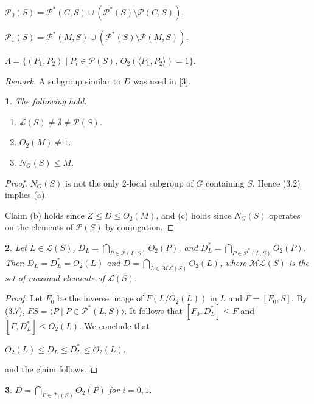 \documentclass[11pt]{article}
\theoremstyle{plain}
\theoremstyle{stmplain}
\newtheorem{stm}{}[section]
\newcommand{\disp}[1]{\begin{center}$\displaystyle #1$\end{center}}
\begin{document}
\medskip
\disp{\mathcal{P}_0(S) = \mathcal{P}^*(C, S) \cup (\mathcal{P}^*(S) \setminus \mathcal{P}(C, S)),}
\disp{\mathcal{P}_1(S) = \mathcal{P}^*(M, S) \cup (\mathcal{P}^*(S) \setminus \mathcal{P}(M, S)),}
\disp{\Lambda = \{(P_1, P_2) \mid P_i \in \mathcal{P}(S),\, O_2(\langle P_1, P_2 \rangle) = 1\}.}

\smallskip
\noindent\textit{Remark.} A subgroup similar to $D$ was used in [3].

\begin{stm}\label{st:4.1}
The following hold:
\begin{enumerate}
\item[(a)] $\mathcal{L}(S) \ne \emptyset \ne \mathcal{P}(S)$.
\item[(b)] $O_2(M) \ne 1$.
\item[(c)] $N_G(S) \le M$.
\end{enumerate}
\end{stm}

\begin{proof}
$N_G(S)$ is not the only 2-local subgroup of $G$ containing $S$. Hence (3.2)
implies (a).

\smallskip
\noindent Claim (b) holds since $Z \le D \le O_2(M)$, and (c) holds since $N_G(S)$
operates on the elements of $\mathcal{P}(S)$ by conjugation.
\end{proof}

\begin{stm}\label{st:4.2}
Let $L \in \mathcal{L}(S)$, $D_L = \bigcap_{P \in \mathcal{P}(L,S)} O_2(P)$,
and $D_L^* = \bigcap_{P \in \mathcal{P}^*(L,S)} O_2(P)$. Then $D_L = D_L^* =
O_2(L)$ and $D = \bigcap_{L \in \mathcal{M}\mathcal{L}(S)} O_2(L)$, where
$\mathcal{M}\mathcal{L}(S)$ is the set of maximal elements of
$\mathcal{L}(S)$.
\end{stm}

\begin{proof}
Let $F_0$ be the inverse image of $F(L/O_2(L))$ in $L$ and $F = [F_0, S]$. By
(3.7), $FS = \langle P \mid P \in \mathcal{P}^*(L, S) \rangle$. It follows that
$[F_0, D_L^*] \le F$ and $[F, D_L^*] \le O_2(L)$. We conclude that
\disp{O_2(L) \le D_L \le D_L^* \le O_2(L).}
and the claim follows.
\end{proof}

\begin{stm}\label{st:4.3}
$D = \bigcap_{P \in \mathcal{P}_i(S)} O_2(P)$ for $i = 0, 1$.
\end{stm}
\end{document}
